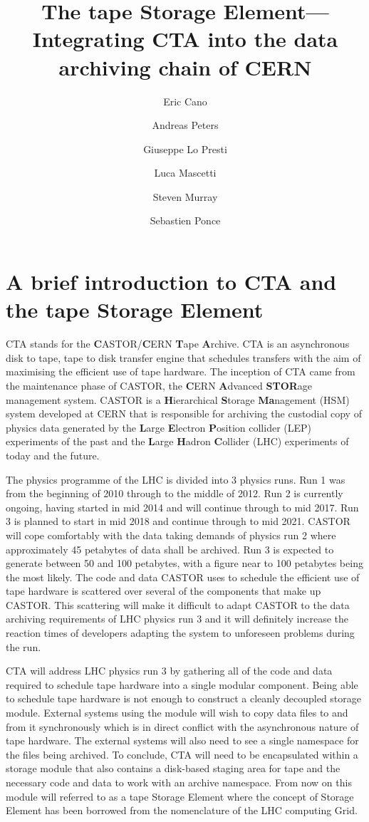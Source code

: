 \documentclass{article}
\title{The tape Storage Element---Integrating CTA into the data archiving chain of CERN}
\author{Eric Cano \and Andreas Peters \and Giuseppe Lo Presti \and Luca Mascetti \and Steven Murray  \and Sebastien Ponce}
\begin{document}
\maketitle

\section{A brief introduction to CTA and the tape Storage Element}

CTA stands for the \textbf{C}ASTOR/\textbf{C}ERN \textbf{T}ape \textbf{A}rchive.  CTA is an asynchronous disk to tape, tape to disk transfer engine that schedules transfers with the aim of maximising the efficient use of tape hardware.  The inception of CTA came from the maintenance phase of CASTOR, the \textbf{C}ERN \textbf{A}dvanced \textbf{STOR}age management system.  CASTOR is a \textbf{H}ierarchical \textbf{S}torage \textbf{Ma}nagement (HSM) system developed at CERN that is responsible for archiving the custodial copy of physics data generated by the \textbf{L}arge \textbf{E}lectron \textbf{P}osition collider (LEP) experiments of the past and the \textbf{L}arge \textbf{H}adron \textbf{C}ollider (LHC) experiments of today and the future.

The physics programme of the LHC is divided into 3 physics runs.  Run 1 was from the beginning of 2010 through to the middle of 2012.  Run 2 is currently ongoing, having started in mid 2014 and will continue through to mid 2017.  Run 3 is planned to start in mid 2018 and continue through to mid 2021.  CASTOR will cope comfortably with the data taking demands of physics run 2 where approximately 45 petabytes of data shall be archived. Run 3 is expected to generate between 50 and 100 petabytes, with a figure near to 100 petabytes being the most likely.  The code and data CASTOR uses to schedule the efficient use of tape hardware is scattered over several of the components that make up CASTOR.  This scattering will make it difficult to adapt CASTOR to the data archiving requirements of LHC physics run 3 and it will definitely increase the reaction times of developers adapting the system to unforeseen problems during the run.

CTA will address LHC physics run 3 by gathering all of the code and data required to schedule tape hardware into a single modular component.  Being able to schedule tape hardware is not enough to construct a cleanly decoupled storage module.  External systems using the module will wish to copy data files to and from it synchronously which is in direct conflict with the asynchronous nature of tape hardware.  The external systems will also need to see a single namespace for the files being archived.  To conclude, CTA will need to be encapsulated within a storage module that also contains a disk-based staging area for tape and the necessary code and data to work with an archive namespace.  From now on this module will referred to as a tape Storage Element where the concept of Storage Element has been borrowed from the nomenclature of the LHC computing Grid.
\end{document}
